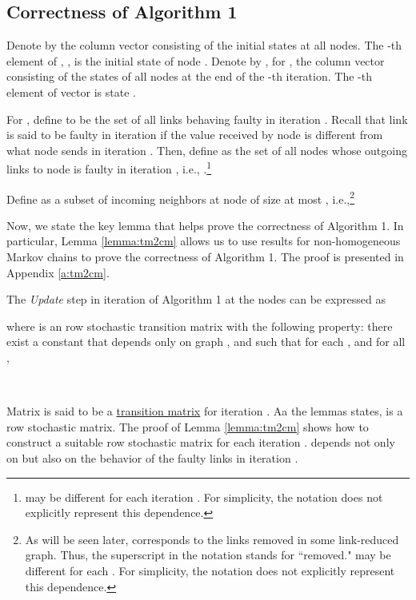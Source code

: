 \documentclass{llncs}
\begin{document}
\subsection{Correctness of Algorithm 1}
Denote by  the column vector consisting of the initial states at all nodes. The -th element of , , is the initial state of node . Denote by , for , the column vector consisting of the states of all nodes at the end
of the -th iteration. The -th element of vector  is state . 

For , define  to be the set of all links behaving faulty in iteration . Recall that link  is said to be faulty in iteration  if the value received by node  is different from what node  sends in iteration . Then, define  as the set of all nodes whose outgoing links to node  is faulty in iteration , i.e., .\footnote{ may be different for each iteration . For simplicity, the notation does not explicitly represent this dependence.}


Define  as a subset of incoming neighbors at node  of size at most , i.e.,\footnote{As will be seen later,  corresponds to the links removed in some link-reduced graph. Thus, the superscript  in the notation stands for ``removed."  may be different for each . For simplicity, the notation does not explicitly represent this dependence.}



Now, we state the key lemma that helps prove the correctness of Algorithm 1. In particular, Lemma \ref{lemma:tm2cm} allows us to use results for non-homogeneous Markov chains to prove the correctness of Algorithm 1.  The proof is presented in Appendix \ref{a:tm2cm}.



\begin{lemma}
\label{lemma:tm2cm}
The {\em Update} step in iteration  of Algorithm 1 at the nodes can be expressed as 


where {\normalfont} is an  row stochastic transition matrix with the following property: there exist a constant  that depends only on graph , and  such that for each , and  for all , 


\end{lemma}

~

Matrix  is said to be a \underline{transition matrix} for iteration . Aa the lemmas states,  is a row stochastic matrix. The proof of Lemma \ref{lemma:tm2cm} shows how to construct a suitable row stochastic matrix  for each iteration .  depends not only on  but also on the behavior of the faulty links in iteration . 
\end{document}
